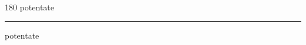 
\begin{frame}
\begin{center}
\begin{turn}{180}
{\fontsize{2.5cm}{1em}\selectfont potentate}
\end{turn}
\vspace{1em}\par  
\hrule
\vspace{1em}\par  
{\fontsize{2.5cm}{1em}\selectfont potentate}
\end{center}
\end{frame}
